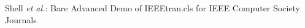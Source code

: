 \documentclass[10pt,journal,compsoc]{IEEEtran}
\begin{document}

 
% 
%



%
{Shell \MakeLowercase{\textit{et al.}}: Bare Advanced Demo of IEEEtran.cls for IEEE Computer Society Journals}


% 



\end{document}
